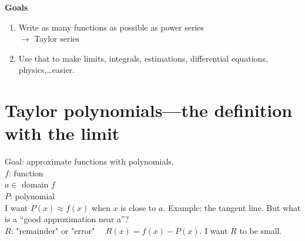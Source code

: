 \textbf{Goals} \begin{enumerate}
    \item Write as many functions as possible as power series \\
          \(\longrightarrow\) Taylor series
    \item Use that to make limits, integrals, estimations, differential equations, physics,\dots easier.
\end{enumerate}

\newpage
\section{Taylor polynomials---the definition with the limit}
Goal: approximate functions with polynomials. \\
\(f\): function \\
\(a \in\) domain \(f\) \\
\(P\): polynomial \\

I want \(P(x) \approx f(x)\) when \(x\) is close to \(a\). Example: the tangent line. But what is a ``good approximation near a''? \\
\(R\): "remainder" or "error" \(\quad R(x) = f(x) - P(x)\). I want \(R\) to be small.

\newpage
